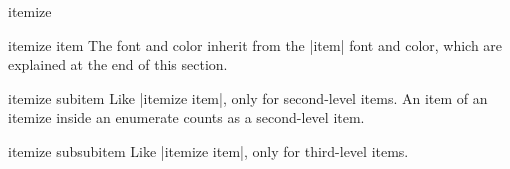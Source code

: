 \begin{environment}{{itemize}}
\begin{element}{itemize item}
    The font and color inherit from the |item| font and color, which are explained at the end of this section.
  \end{element}

  \begin{element}{itemize subitem}\yes\yes\yes
    Like |itemize item|, only for second-level items. An item of an itemize inside an enumerate counts as a second-level item.
  \end{element}

  \begin{element}{itemize subsubitem}\yes\yes\yes
    Like |itemize item|, only for third-level items.
  \end{element}
\end{environment}

